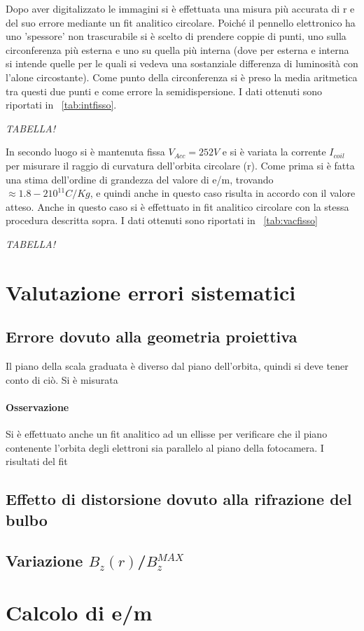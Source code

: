 \documentclass[10pt,a4paper]{article}
\begin{document}
Dopo aver digitalizzato le immagini si è effettuata una misura più accurata di r e del suo errore mediante un fit analitico circolare. Poiché il pennello elettronico ha uno 'spessore' non trascurabile si è scelto di prendere coppie di punti, uno sulla circonferenza più esterna e uno su quella più interna (dove per esterna e interna si intende quelle per le quali si vedeva una sostanziale differenza di luminosità con l'alone circostante). Come punto della circonferenza si è preso la media aritmetica tra questi due punti e come errore la semidispersione. I dati ottenuti sono riportati in \tablename{~\ref{tab:intfisso}}.

\emph{TABELLA!}

In secondo luogo si è mantenuta fissa $V_{Acc} = \unit{252}{V}$ e si è variata la corrente $I_{coil}$ per misurare il raggio di curvatura dell'orbita circolare (r). Come prima si è fatta una stima dell'ordine di grandezza del valore di e/m, trovando $\approx \unit{1.8-2 10^{11}}{C/Kg}$, e quindi anche in questo caso risulta in accordo con il valore atteso.
Anche in questo caso si è effettuato in fit analitico circolare con la stessa procedura descritta sopra. I dati ottenuti sono riportati in \tablename{~\ref{tab:vacfisso}}

\emph{TABELLA!}
\section{Valutazione errori sistematici}

\subsection{Errore dovuto alla geometria proiettiva}
Il piano della scala graduata è diverso dal piano dell'orbita, quindi si deve tener conto di ciò. Si è misurata 

\paragraph{Osservazione}
Si è effettuato anche un fit analitico ad un ellisse per verificare che il piano contenente l'orbita degli elettroni sia parallelo al piano della fotocamera. I risultati del fit 

\subsection{Effetto di distorsione dovuto alla rifrazione del bulbo}

\subsection{Variazione $B_z(r)$/$B_z^{MAX}$}

\section{Calcolo di e/m}


\end{document}
